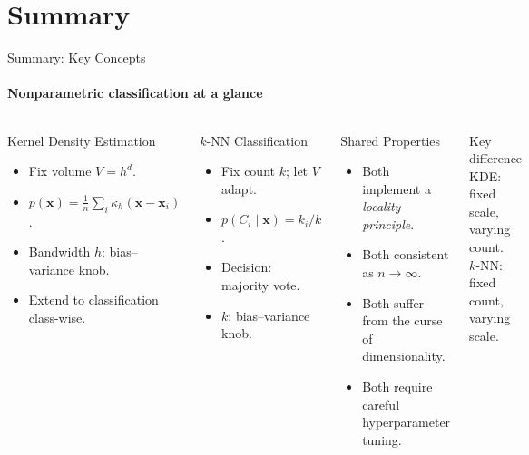 \section{Summary}

\begin{frame}{Summary: Key Concepts}
  \framesubtitle{Nonparametric classification at a glance}
  \begin{columns}[T]
      \begin{block}{Kernel Density Estimation}
        \begin{itemize}
          \item Fix volume $V = h^d$.
          \item $p(\mathbf{x}) = \frac{1}{n}\sum_i \kappa_h(\mathbf{x}-\mathbf{x}_i)$.
          \item Bandwidth $h$: bias–variance knob.
          \item Extend to classification class-wise.
        \end{itemize}
      \end{block}
      \vspace{4pt}
      \begin{block}{$k$-NN Classification}
        \begin{itemize}
          \item Fix count $k$; let $V$ adapt.
          \item $p(C_i\mid\mathbf{x}) = k_i/k$.
          \item Decision: majority vote.
          \item $k$: bias–variance knob.
        \end{itemize}
      \end{block}
      \begin{block}{Shared Properties}
        \begin{itemize}
          \item Both implement a \emph{locality principle}.
          \item Both consistent as $n\to\infty$.
          \item Both suffer from the curse of dimensionality.
          \item Both require careful hyperparameter tuning.
        \end{itemize}
      \end{block}
      \vspace{4pt}
      \begin{alertblock}{Key difference}
        KDE: fixed scale, varying count.\\
        $k$-NN: fixed count, varying scale.
      \end{alertblock}
  \end{columns}
\end{frame}


